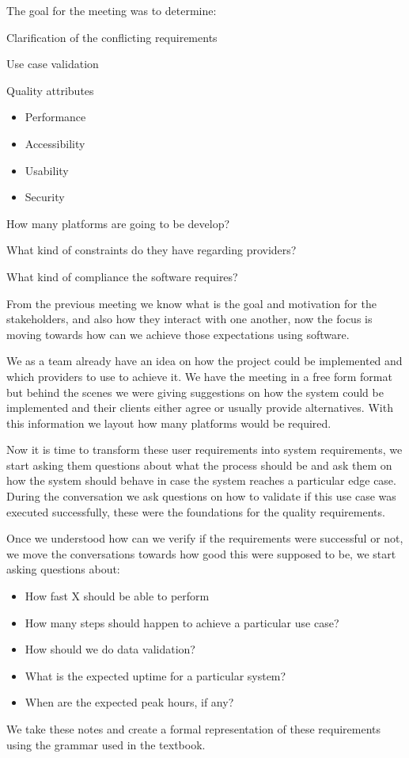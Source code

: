 \noindent The goal for the meeting was to determine:
\begin{packed_enum}
    \item Clarification of the conflicting requirements
    \item Use case validation
    \item Quality attributes
    \begin{itemize}
        \item Performance
        \item Accessibility 
        \item Usability
        \item Security
    \end{itemize}
    \item How many platforms are going to be develop?
    \item What kind of constraints do they have regarding providers?
    \item What kind of compliance the software requires?
\end{packed_enum}

\noindent From the previous meeting we know what is the goal and motivation 
for the stakeholders, and also how they interact with one another, now the 
focus is moving towards how can we achieve those expectations 
using software. \newline

\noindent We as a team already have an idea on how the project could be 
implemented and which providers to use to achieve it. We have the meeting in a 
free form format but behind the scenes we were giving suggestions on how the 
system could be implemented and their clients either agree or usually provide 
alternatives. With this information we layout how many platforms 
would be required. \newline

\noindent Now it is time to transform these user requirements into system 
requirements, we start asking them questions about what the process should be 
and ask them on how the system should behave in case the system reaches a 
particular edge case. During the conversation we ask questions on how to 
validate if this use case was executed successfully, these were the 
foundations for the quality requirements. \newline

\pagebreak

\noindent Once we understood how can we verify if the requirements were 
successful or not, we move the conversations towards how good this were 
supposed to be, we start asking questions about:
\begin{itemize}
    \item How fast X should be able to perform
    \item How many steps should happen to achieve a particular use case?
    \item How should we do data validation?
    \item What is the expected uptime for a particular system?
    \item When are the expected peak hours, if any?
\end{itemize}

\noindent We take these notes and create a formal representation of these requirements 
using the grammar used in the textbook.




